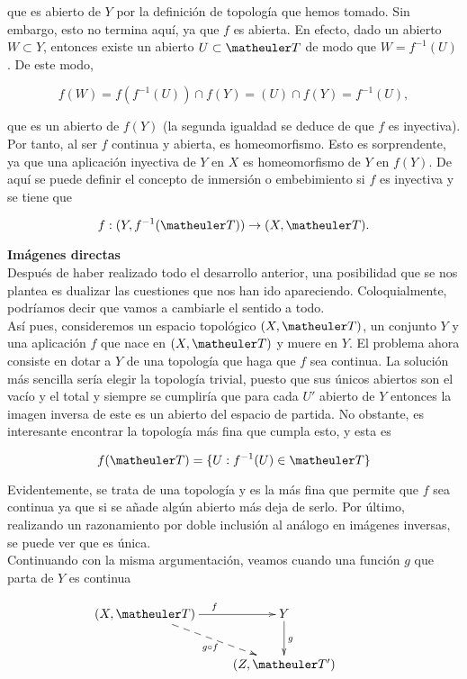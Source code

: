 que es abierto de $Y$ por la definición de topología que hemos tomado. Sin embargo, esto no termina aquí, ya que $f$ es abierta. En efecto, dado un abierto $W\subset Y$, entonces existe un abierto $U\subset \T$ de modo que $W=f^{-1}(U)$. De este modo, 

\[f(W)=f(f^{-1}(U))\cap f(Y)=(U)\cap f(Y)=f^{-1}(U),\]

que es un abierto de $f(Y)$ (la segunda igualdad se deduce de que $f$ es inyectiva). Por tanto, al ser $f$ continua y abierta, es homeomorfismo. Esto es sorprendente, ya que una aplicación inyectiva de $Y$ en $X$ es homeomorfismo de $Y$ en $f(Y)$. De aquí se puede definir el concepto de inmersión o embebimiento si $f$ es inyectiva y se tiene que 

\[f:(Y,f^{-1}(\T)) \to (X,\T).\]

\textbf{Imágenes directas} \\

Después de haber realizado todo el desarrollo anterior, una posibilidad que se nos plantea es dualizar las cuestiones que nos han ido apareciendo. Coloquialmente, podríamos decir que vamos a cambiarle el sentido a todo. \\

Así pues, consideremos un espacio topológico $(X,\T)$, un conjunto $Y$ y una aplicación $f$ que nace en $(X,\T)$ y muere en $Y$. El problema ahora consiste en dotar a $Y$ de una topología que haga que $f$ sea continua. La solución más sencilla sería elegir la topología trivial, puesto que sus únicos abiertos son el vacío y el total y siempre se cumpliría que para cada $U'$ abierto de $Y$ entonces la imagen inversa de este es un abierto del espacio de partida. No obstante, es interesante encontrar la topología más fina que cumpla esto, y esta es 

\[f(\T)=\{U: f^{-1}(U)\in \T\}\]

Evidentemente, se trata de una topología y es la más fina que permite que $f$ sea continua ya que si se añade algún abierto más deja de serlo. Por último, realizando un razonamiento por doble inclusión al análogo en imágenes inversas, se puede ver que es única. \\

Continuando con la misma argumentación, veamos cuando una función $g$ que parta de $Y$ es continua

\begin{equation*}
\xymatrix{
(X,\T) \ar[r]^f \ar@{-->}[rd]_{g\circ f} &
Y \ar[d]^g & \\
&(Z,\T')}
\end{equation*}

